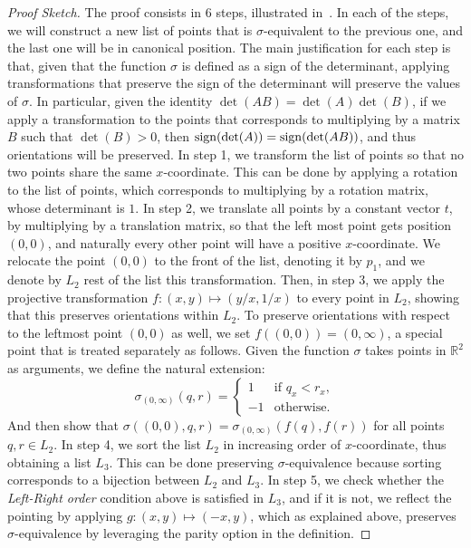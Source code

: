 
\begin{proof}[Proof Sketch]
The proof consists in 6 steps, illustrated in~. In each of the steps, we will construct a new list of points that is $\sigma$-equivalent to the previous one, and the last one will be in canonical position.
The main justification for each step is that, given that the function $\sigma$ is defined as a sign of the determinant, applying transformations that preserve the sign of the determinant will preserve the values of $\sigma$. In particular, given the identity $\det(AB) = \det(A)\det(B)$, if we apply a transformation to the points that corresponds to multiplying by a matrix $B$ such that $\det(B) > 0$, then $\operatorname{sign}(\det(A)) = \operatorname{sign}(\det(AB))$, and thus orientations will be preserved.
In step 1, we transform the list of points so that no two points share the same $x$-coordinate. This can be done by applying a rotation to the list of points, which corresponds to multiplying by a rotation matrix, whose determinant is $1$. 
In step 2, we translate all points by a constant vector $t$, by multiplying by a translation matrix, so that the left most point gets position $(0, 0)$, and naturally every other point will have a positive $x$-coordinate. We relocate the point $(0,0)$ to the front of the list, denoting it by $p_1$, and we denote by $L_2$ rest of the list this transformation.
Then, in step 3, we  apply the projective transformation $f: (x, y) \mapsto (y/x, 1/x)$ to every point in $L_2$, showing that this preserves orientations within $L_2$. To preserve orientations with respect to the leftmost point $(0, 0)$ as well, we set $f( (0, 0)) = (0, \infty)$, a special point that is treated separately as follows. Given the function $\sigma$ takes points in $\mathbb{R}^2$ as arguments, we define the natural extension:
\[
  \sigma_{(0, \infty)}(q, r) = \begin{cases}
    1 & \text{if } q_x < r_x, \\
    -1 & \text{otherwise}.  
  \end{cases}
\] 
And then show that $\sigma((0, 0), q, r) = \sigma_{(0, \infty)}(f(q), f(r))$ for all points $q, r \in L_2$. 
In step 4, we sort the list $L_2$ in increasing order of $x$-coordinate, thus obtaining a list $L_3$. This can be done preserving $\sigma$-equivalence because sorting corresponds to a bijection between $L_2$ and $L_3$.
In step 5, we check whether the \emph{Left-Right order} condition above is satisfied in $L_3$, and if it is not, we reflect the pointing by applying $g: (x, y) \mapsto (-x, y)$, which as explained above, preserves $\sigma$-equivalence by leveraging the parity option in the definition.

\end{proof}
